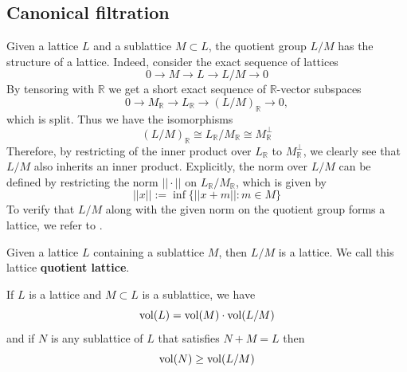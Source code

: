 \subsection{Canonical filtration}
Given a lattice $L$ and a sublattice $M \subset L$, the quotient group $L/M$ has the structure of
a lattice. Indeed, consider the exact sequence of lattices
\[0\rightarrow M\rightarrow L\rightarrow L/M\rightarrow 0\]
By tensoring with $\mathbb{R}$ we get a short exact sequence of $\mathbb{R}$-vector subspaces
\[0\rightarrow M_\mathbb{R} \rightarrow L_\mathbb{R} \rightarrow (L/M)_\mathbb{R}\rightarrow 0,\]
which is split. Thus we have the isomorphisms
\[(L/M)_\mathbb{R} \cong L_\mathbb{R}/M_\mathbb{R} \cong M^\perp_\mathbb{R}\]
Therefore, by restricting of the inner product over $L_\mathbb{R}$ to $M^\perp_\mathbb{R}$, we clearly see that
$L/M$ also inherits an inner product. Explicitly, the norm over $L/M$ can be defined by restricting the norm $||\cdot||$ on $L_\mathbb{R}/M_\mathbb{R}$, which is given by
\[||x||:= \inf\{ ||x+m||: m \in M \}\]
To verify that $L/M$ along with the given norm on the quotient group forms a lattice, we refer to \cite{MR1905312}.
\begin{definition}
    Given a lattice $L$ containing a sublattice $M$, then $L/M$ is a lattice. We call this lattice \textbf{quotient lattice}.
\end{definition}
\begin{lemma}\label{volume-of-lattice}\cite[Proposition 4.1]{MR2127941}
    If $L$ is a lattice and $M\subset L$ is a sublattice, we have
    \[\operatorname{vol}(L) = \operatorname{vol}(M)\cdot \operatorname{vol}(L/M)\]
    and if $N$ is any sublattice of $L$ that satisfies $N+M=L$ then
    \[\operatorname{vol}(N) \ge \operatorname{vol}(L/M)\]
\end{lemma}
